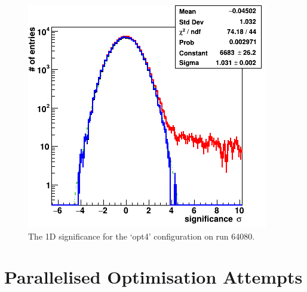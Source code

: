 \begin{figure}[ht] 
        \centering \includegraphics[width=\columnwidth]{figures/opt4_sig.png}

        \caption{
                \label{fig:opt4_sig1D} The 1D significance for the `opt4' configuration on run 64080.
        }
\end{figure}

\section{Parallelised Optimisation Attempts}
